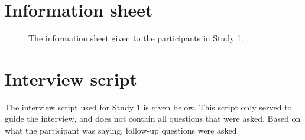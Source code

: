 \section{Information sheet}\label{ch:information_sheet}
\begin{figure}[htp] 
\caption[Study 1 information sheet]{The information sheet given to the participants in Study 1.}
\label{fig:informationsheet}
\end{figure} 

\section{Interview script}\label{ch:interviewscript}
The interview script used for Study 1 is given below. This script only served to guide the interview, and does not contain all questions that were asked. Based on what the participant was saying, follow-up questions were asked. 

